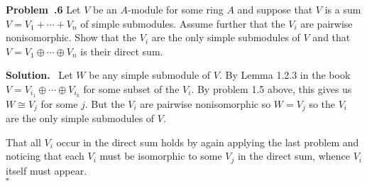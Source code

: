 \documentclass[12pt]{article}
\newenvironment{prob}[1]{\par\smallskip
	\noindent\begin{mdframed}\small \textbf{Problem~\thesection.#1} \rmfamily\quad}{\end{mdframed}\medskip}
\newenvironment{sol}{\noindent \textbf{Solution.} \,}{\\\hspace*{\fill}$\square$\medskip}
\begin{document}
\begin{prob}{6}
	Let $V$ be an $A$-module for some ring $A$ and suppose that $V$ is a sum $V=V_1+\cdots+V_n$ of simple submodules. Assume further that the $V_i$ are pairwise nonisomorphic. Show that the $V_i$ are the only simple submodules of $V$ and that $V=V_1\oplus\cdots\oplus V_n$ is their direct sum.
\end{prob}
\begin{sol}
	Let $W$ be any simple submodule of $V$. By Lemma 1.2.3 in the book $V=V_{i_1}\oplus\cdots\oplus V_{i_k}$ for some subset of the $V_i$. By problem 1.5 above, this gives us $W\cong V_j$ for some $j$. But the $V_i$ are pairwise nonisomorphic so $W=V_j$ so the $V_i$ are the only simple submodules of $V$.
	
	That all $V_i$ occur in the direct sum holds by again applying the last problem and noticing that each $V_i$ must be isomorphic to some $V_j$ in the direct sum, whence $V_i$ itself must appear.
\end{sol}
\end{document}
